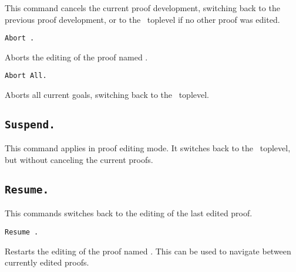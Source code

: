 This command cancels the current proof development, switching back to
the previous proof development, or to the \Coq\ toplevel if no other
proof was edited.

\begin{ErrMsgs}
\item {}
\end{ErrMsgs}

\begin{Variants}

\item {\tt Abort {\ident}.}

  Aborts the editing of the proof named {\ident}.

\item {\tt Abort All.}

  Aborts all current goals, switching back to the \Coq\ toplevel.

\end{Variants}

\subsection[\tt Suspend.]{\tt Suspend.}

This command applies in proof editing mode. It switches back to the
\Coq\ toplevel, but without canceling the current proofs.

\subsection[\tt Resume.]{\tt Resume.\label{Resume}}

This commands switches back to the editing of the last edited proof.

\begin{ErrMsgs}
\item {}
\end{ErrMsgs}

\begin{Variants}

\item {\tt Resume {\ident}.}

  Restarts the editing of the proof named {\ident}. This can be used
  to navigate between currently edited proofs.

\end{Variants}

\begin{ErrMsgs}
\item {}
\end{ErrMsgs}


